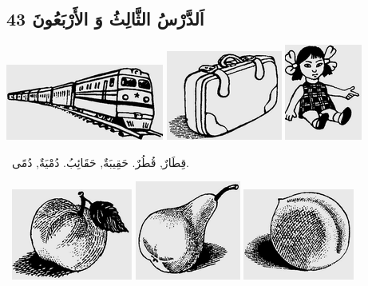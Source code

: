 \documentclass[a5paper]{article}
\begin{document}
\subsection[اَلدَّرْسُ الثَّالِثُ وَ الأَرْبَعُونَ 43]{اَلدَّرْسُ الثَّالِثُ وَ الأَرْبَعُونَ 43}
 \includegraphics[width=2.0417in,height=0.9791in]{MuhammadBagauddinlatinized-img131.png}   \includegraphics[width=1.5in,height=1.1563in]{MuhammadBagauddinlatinized-img132.png}   \includegraphics[width=1in,height=1.2398in]{MuhammadBagauddinlatinized-img133.png} 

\ قِطَارٌ, قُطُرٌ. حَقِيبَةٌ, حَقَائِبُ. دُمْيَةٌ, دُمًى. 

\  \includegraphics[width=1.5626in,height=1.1772in]{MuhammadBagauddinlatinized-img134.png}   \includegraphics[width=1.3646in,height=1.2811in]{MuhammadBagauddinlatinized-img135.png}   \includegraphics[width=1.4374in,height=1.1772in]{MuhammadBagauddinlatinized-img136.png} 
\end{document}
